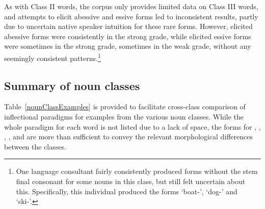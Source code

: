 \begin{table}[ht]
\begin{tabular}{ lllll}
\end{tabular}
\end{table}As with Class II words, the corpus only provides limited data on Class III words, and attempts to elicit abessive and essive forms led to inconsistent results, partly due to uncertain native speaker intuition for these rare forms. However, elicited abessive forms were consistently in the strong grade, while elicited essive forms were sometimes in the strong grade, sometimes in the weak grade, without any seemingly consistent patterns.\footnote{One language consultant fairly consistently produced  forms without the stem final consonant for some nouns in this class, but still felt uncertain about this. Specifically, this individual produced the forms  ‘boat-’,  ‘dog-’ and  ‘ski-’.} 

\FB

\subsection{Summary of noun classes}\label{summaryNounClasses}
Table~\vref{nounClassExamples} is provided to facilitate cross-class comparison of inflectional paradigms for examples from the various noun classes. While the whole paradigm for each word is not listed due to a lack of space, the forms for , , , ,  and  are more than sufficient to convey the relevant morphological differences between the classes.


